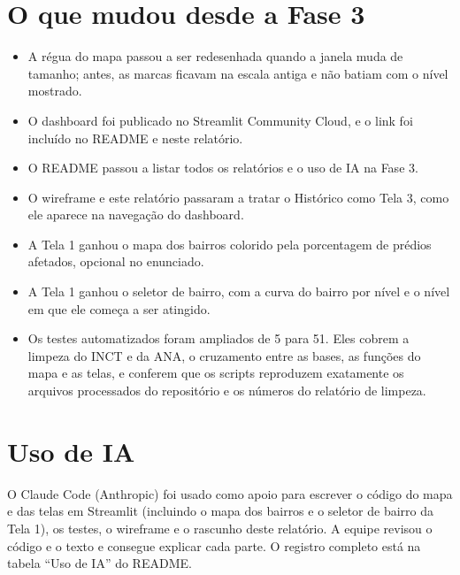 \documentclass[11pt,a4paper]{article}
\begin{document}
\section{O que mudou desde a Fase 3}
\begin{itemize}
  \item A régua do mapa passou a ser redesenhada quando a janela muda de tamanho; antes, as marcas ficavam na escala antiga e não batiam com o nível mostrado.
  \item O dashboard foi publicado no Streamlit Community Cloud, e o link foi incluído no README e neste relatório.
  \item O README passou a listar todos os relatórios e o uso de IA na Fase 3.
  \item O wireframe e este relatório passaram a tratar o Histórico como Tela 3, como ele aparece na navegação do dashboard.
  \item A Tela 1 ganhou o mapa dos bairros colorido pela porcentagem de prédios afetados, opcional no enunciado.
  \item A Tela 1 ganhou o seletor de bairro, com a curva do bairro por nível e o nível em que ele começa a ser atingido.
  \item Os testes automatizados foram ampliados de 5 para 51. Eles cobrem a limpeza do INCT e da ANA, o cruzamento entre as bases, as funções do mapa e as telas, e conferem que os scripts reproduzem exatamente os arquivos processados do repositório e os números do relatório de limpeza.
\end{itemize}

\section{Uso de IA}
O Claude Code (Anthropic) foi usado como apoio para escrever o código do mapa e das telas em Streamlit (incluindo o mapa dos bairros e o seletor de bairro da Tela 1), os testes, o wireframe e o rascunho deste relatório. A equipe revisou o código e o texto e consegue explicar cada parte. O registro completo está na tabela ``Uso de IA'' do README.
\end{document}

